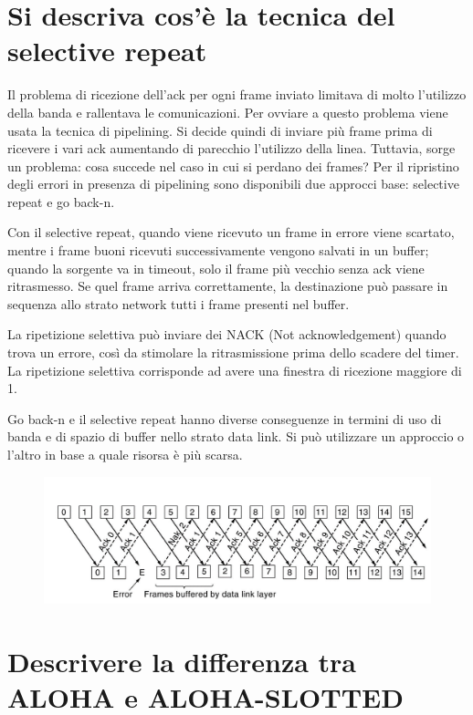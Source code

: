 \section{Si descriva cos'è la tecnica del selective repeat}

Il problema di ricezione dell’ack per ogni frame inviato limitava di molto l’utilizzo della banda e rallentava le comunicazioni. Per ovviare a questo problema viene usata la tecnica di pipelining. Si decide quindi di inviare più frame prima di ricevere i vari ack aumentando di parecchio l’utilizzo della linea. Tuttavia, sorge un problema: cosa succede nel caso in cui si perdano dei frames? Per il ripristino degli errori in presenza di pipelining sono disponibili due approcci base: selective repeat e go back-n.

Con il selective repeat, quando viene ricevuto un frame in errore viene scartato, mentre i frame buoni ricevuti successivamente vengono salvati in un buffer; quando la sorgente va in timeout, solo il frame più vecchio senza ack viene ritrasmesso. Se quel frame arriva correttamente, la destinazione può passare in sequenza allo strato network tutti i frame presenti nel buffer.

La ripetizione selettiva può inviare dei NACK (Not acknowledgement) quando trova un errore, così da stimolare la ritrasmissione prima dello scadere del timer.
La ripetizione selettiva corrisponde ad avere una finestra di ricezione maggiore di 1.

Go back-n e il selective repeat hanno diverse conseguenze in termini di uso di banda e di spazio di buffer nello strato data link. Si può utilizzare un approccio o l'altro in base a quale risorsa è più scarsa.

\begin{figure}[H]
\centering
\includegraphics[scale=0.8]{res/img/21_SelectiveRepeat.png}
\end{figure}
 
\section{Descrivere la differenza tra ALOHA e ALOHA-SLOTTED}

